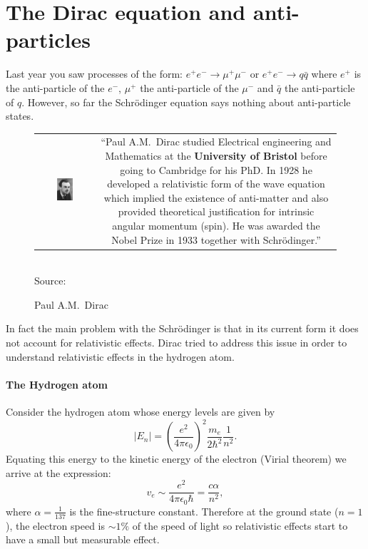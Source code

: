 \section{The Dirac equation and anti-particles}
Last year you saw processes of the form:
$e^+e^-\to \mu^+\mu^-$ or $e^+e^-\to q\bar{q}$ where $e^+$ is the anti-particle
of the $e^-$, $\mu^+$ the anti-particle of the $\mu^-$ and $\bar{q}$ the anti-particle of $q$. However, so far the Schr\"odinger equation says nothing about anti-particle states. 

\begin{figure}
\caption{Paul A.M.~Dirac}
\begin{tabular}{cc}
\parbox{0.32\textwidth}{
\includegraphics[width=0.3\textwidth]{fig/dirac/Dirac_4.jpg}
}&
\parbox{0.66\textwidth}{\textsf{\small
    ``Paul A.M.~Dirac studied Electrical engineering and Mathematics at the {\bf University of Bristol} before going to Cambridge for his PhD. In 1928 he developed a relativistic form of the wave equation which implied the existence of anti-matter and also provided theoretical justification for intrinsic angular momentum (spin). He was awarded the Nobel Prize in 1933 together with Schr\"odinger.'' 
}}
\end{tabular}
\\  \textsf{Source: }
\end{figure}

In fact the main problem with the Schr\"odinger is that in its current form it does not account for relativistic effects. Dirac tried to address this issue in order to understand relativistic effects in the hydrogen atom. 

\paragraph{The Hydrogen atom}
Consider the hydrogen atom whose energy levels are given by
\[
|E_n|=\left(\frac{e^2}{4\pi\epsilon_0}\right)^2\frac{m_{e}}{2\hbar^2}\frac{1}{n^2}.
\]
Equating this energy to the kinetic energy of the electron (Virial theorem) we arrive at the expression:
\[
v_{e}\sim \frac{e^2}{4\pi\epsilon_0\hbar}=\frac{c\alpha}{n^2},
\]
\noindent where $\alpha=\frac{1}{137}$ is the fine-structure constant.
Therefore at the ground state ($n=1$), the electron speed is $\sim 1\%$ of the speed of light so relativistic effects start to have a small but measurable effect.


